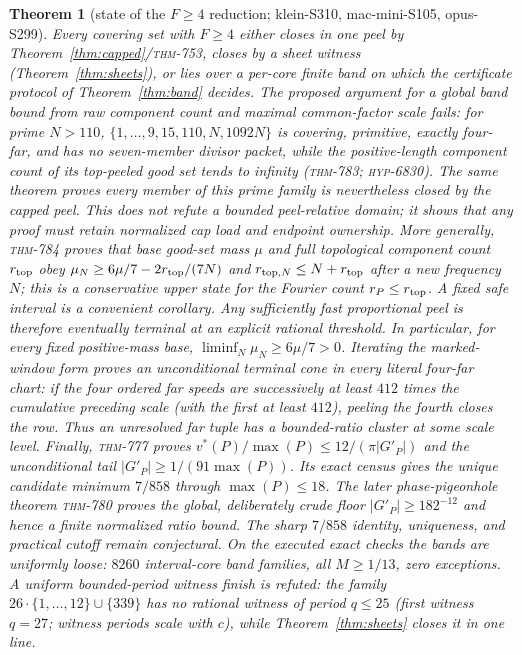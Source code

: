 \documentclass[11pt]{article}
\newtheorem{theorem}{Theorem}[section]
\theoremstyle{definition}
\begin{document}
\begin{theorem}[state of the $F\ge4$ reduction; klein-S310, mac-mini-S105, opus-S299]
\label{thm:claimB}
Every covering set with $F\ge4$ either closes in one peel by
Theorem~\ref{thm:capped}/\textsc{thm}-753, closes by a sheet witness
(Theorem~\ref{thm:sheets}), or lies over a per-core finite band on which the certificate
protocol of Theorem~\ref{thm:band} decides. The proposed argument for a global band
bound from raw component count and maximal common-factor scale fails: for prime $N>110$,
$\{1,\ldots,9,15,110,N,1092N\}$ is covering, primitive, exactly four-far, and has no
seven-member divisor packet, while the positive-length component count of its top-peeled good set tends
to infinity (\textsc{thm}-783; \textsc{hyp}-6830). The same theorem proves every member
of this prime family is nevertheless closed by the capped peel. This does not refute a bounded
peel-relative domain; it shows that any proof must retain normalized cap load and
endpoint ownership. More generally, \textsc{thm}-784 proves that base good-set mass
$\mu$ and full topological component count $r_{\rm top}$ obey
$\mu_N\ge6\mu/7-2r_{\rm top}/(7N)$ and
$r_{{\rm top},N}\le N+r_{\rm top}$ after a new frequency $N$; this is a conservative
upper state for the Fourier count $r_P\le r_{\rm top}$. A fixed safe interval is a convenient
corollary. Any sufficiently fast proportional peel is therefore eventually
terminal at an explicit rational threshold. In particular, for every fixed
positive-mass base, $\liminf_N\mu_N\ge6\mu/7>0$. Iterating the marked-window
form proves an unconditional terminal cone in every literal four-far chart:
if the four ordered far speeds are successively at least $412$ times the
cumulative preceding scale (with the first at least $412$), peeling the fourth
closes the row. Thus an unresolved far tuple has a bounded-ratio cluster at
some scale level. Finally, \textsc{thm}-777 proves
$v^\ast(P)/\max(P)\le12/(\pi|G'_P|)$ and the unconditional tail
$|G'_P|\ge1/(91\max(P))$. Its exact census gives the unique candidate minimum
$7/858$ through $\max(P)\le18$. The later phase-pigeonhole theorem
\textsc{thm}-780 proves the global, deliberately crude floor
$|G'_P|\ge182^{-12}$ and hence a finite normalized ratio bound. The sharp
$7/858$ identity, uniqueness, and practical cutoff remain conjectural. On the executed exact checks the
bands are uniformly loose: $8260$ interval-core band families, all $M\ge 1/13$, zero
exceptions. A uniform bounded-period witness finish is \emph{refuted}: the family
$26\cdot\{1,\dots,12\}\cup\{339\}$ has no rational witness of period $q\le25$ (first
witness $q=27$; witness periods scale with $c$), while Theorem~\ref{thm:sheets} closes it
in one line.
\end{theorem}
\end{document}
